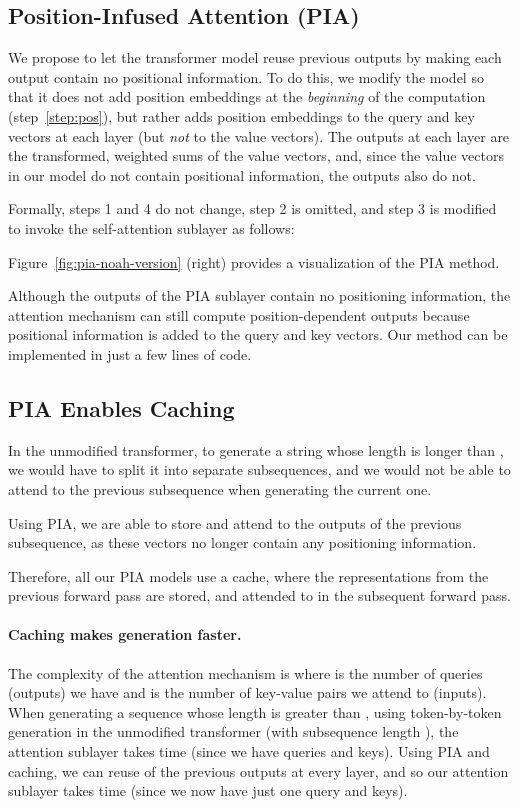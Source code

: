 \documentclass[11pt,a4paper]{article}
\begin{document}
\subsection{Position-Infused Attention (PIA)}

We propose to let the transformer model reuse previous outputs by making each output contain no positional information. 
To do this, we modify the model so that it does not add position embeddings at the \emph{beginning} of the computation (step~\ref{step:pos}), but rather adds position embeddings to the query and key vectors at each layer (but \emph{not} to the value vectors). The outputs at each layer are the transformed, weighted sums of the value vectors, and, since the value vectors in our model do not contain positional information, the outputs also do not. 

Formally, steps 1 and 4 do not change, step 2 is omitted, and step 3 is modified to invoke the self-attention sublayer as follows:

Figure~\ref{fig:pia-noah-version} (right) provides a visualization of the PIA method.



Although the outputs of the PIA sublayer contain no positioning information, the attention mechanism can still compute position-dependent outputs because positional information is added to the query and key vectors. Our method can be implemented in just a few lines of code. 


\subsection{PIA Enables Caching} \label{sec:PIA-caching}


In the unmodified transformer, to generate a string whose length is longer than , we would have to split it into separate subsequences, and we would not be able to attend to the previous subsequence when generating the current one. 

Using PIA, we are able to store and attend to the outputs of the previous subsequence, as these vectors no longer contain any positioning information. 

Therefore, all our PIA models use a cache, where the representations from the previous forward pass are stored, and attended to in the subsequent forward pass.


\paragraph{Caching makes generation faster.}
The complexity of the attention mechanism is  where  is the number of queries (outputs) we have and  is the number of key-value pairs we attend to (inputs). When generating a sequence whose length is greater than , using token-by-token generation in the unmodified transformer (with subsequence length ), the attention sublayer takes  time (since we have  queries and  keys). Using PIA and caching, we can reuse  of the previous outputs at every layer, and so our attention sublayer takes  time (since we now have just one query and  keys).  
\end{document}
